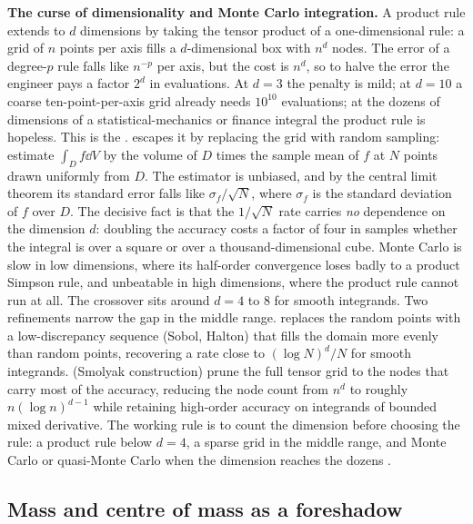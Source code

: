 

\begin{mastery}
\textbf{The curse of dimensionality and Monte Carlo integration.} A
product rule extends to $d$ dimensions by taking the tensor product of
a one-dimensional rule: a grid of $n$ points per axis fills a
$d$-dimensional box with $n^{d}$ nodes. The error of a degree-$p$ rule
falls like $n^{-p}$ per axis, but the cost is $n^{d}$, so to halve the
error the engineer pays a factor $2^{d}$ in evaluations. At $d = 3$ the
penalty is mild; at $d = 10$ a coarse ten-point-per-axis grid already
needs $10^{10}$ evaluations; at the dozens of dimensions of a
statistical-mechanics or finance integral the product rule is
hopeless. This is the .
 escapes it by replacing the grid with
random sampling: estimate $\int_{D} f\dd V$ by the volume of $D$ times
the sample mean of $f$ at $N$ points drawn uniformly from $D$. The
estimator is unbiased, and by the central limit theorem its standard
error falls like $\sigma_{f}/\sqrt{N}$, where $\sigma_{f}$ is the
standard deviation of $f$ over $D$. The decisive fact is that the
$1/\sqrt{N}$ rate carries \emph{no} dependence on the dimension $d$:
doubling the accuracy costs a factor of four in samples whether the
integral is over a square or over a thousand-dimensional cube. Monte
Carlo is slow in low dimensions, where its half-order convergence loses
badly to a product Simpson rule, and unbeatable in high dimensions,
where the product rule cannot run at all. The crossover sits around
$d = 4$ to $8$ for smooth integrands. Two refinements narrow the gap in
the middle range.  replaces the random
points with a low-discrepancy sequence (Sobol, Halton) that fills the
domain more evenly than random points, recovering a rate close to
$(\log N)^{d}/N$ for smooth integrands. 
(Smolyak construction) prune the full tensor grid to the nodes that
carry most of the accuracy, reducing the node count from $n^{d}$ to
roughly $n(\log n)^{d-1}$ while retaining high-order accuracy on
integrands of bounded mixed derivative. The working rule is to count
the dimension before choosing the rule: a product rule below $d = 4$, a
sparse grid in the middle range, and Monte Carlo or quasi-Monte Carlo
when the dimension reaches the dozens \cite{text:v2ch06-burden-faires-numerical}.
\end{mastery}

\subsection{Mass and centre of mass as a foreshadow}

